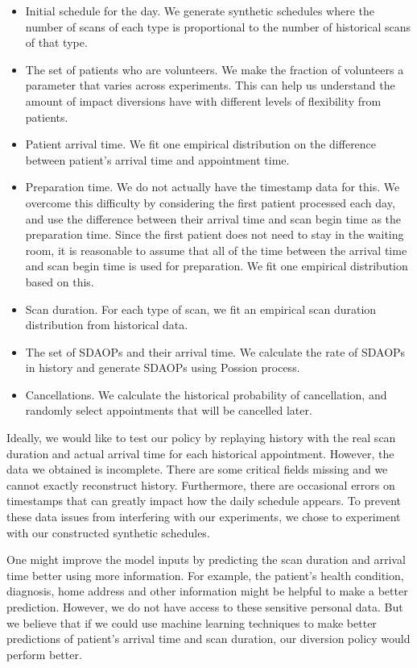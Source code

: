 \begin{itemize}
\item Initial schedule for the day. We generate synthetic schedules
  where the number of scans of each type is proportional to the
  number of historical scans of that type.
\item The set of patients who are volunteers. We make the fraction
  of volunteers a parameter that varies across experiments.
  This can help us understand the amount of impact diversions have
  with different levels of flexibility from patients.
\item Patient arrival time. We fit one empirical distribution on
  the difference between patient's arrival time and appointment time.
\item Preparation time. We do not actually have the timestamp data for this.
  We overcome this difficulty by considering the first patient processed each day,
  and use the difference between their arrival time and scan begin time
  as the preparation time. Since the first patient does not need to stay in the
  waiting room, it is reasonable to assume that all of the time between the arrival time
  and scan begin time is used for preparation. We fit one empirical distribution
  based on this.
\item Scan duration. For each type of scan, we fit an empirical
  scan duration distribution from historical data.
\item The set of SDAOPs and their arrival time. We calculate the rate of
  SDAOPs in history and generate SDAOPs using Possion process.
\item Cancellations. We calculate the historical probability of cancellation,
  and randomly select appointments that will be cancelled later.
\end{itemize}
Ideally, we would like to test our policy by replaying history with the real
scan duration and actual arrival time for each historical appointment. However,
the data we obtained is incomplete. There are some critical fields missing
and we cannot exactly reconstruct history. Furthermore, there are occasional
errors on timestamps that can greatly impact how the daily schedule appears.
To prevent these data issues from interfering with our experiments, we chose
to experiment with our constructed synthetic schedules.

One might improve the model inputs by predicting the scan duration and
arrival time better using more information. For example, the patient's
health condition, diagnosis, home address and other information might be
helpful to make a better prediction. However, we do not have access to these
sensitive personal data. But we believe that if we could use machine learning
techniques to make better predictions of patient's arrival time and scan duration,
our diversion policy would perform better.

